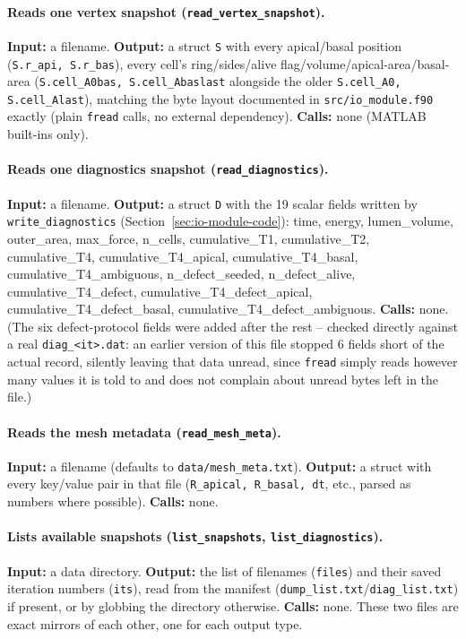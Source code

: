 \documentclass[11pt,a4paper]{report}
\begin{document}
\paragraph{Reads one vertex snapshot (\texttt{read\_vertex\_snapshot}).}
\textbf{Input:} a filename. \textbf{Output:} a struct \texttt{S} with
every apical/basal position (\texttt{S.r\_api, S.r\_bas}), every cell's
ring/sides/alive flag/volume/apical-area/basal-area
(\texttt{S.cell\_A0bas, S.cell\_Abaslast} alongside the older
\texttt{S.cell\_A0, S.cell\_Alast}), matching the byte layout documented
in \texttt{src/io\_module.f90} exactly (plain \texttt{fread} calls, no
external dependency). \textbf{Calls:} none (MATLAB built-ins only).
\paragraph{Reads one diagnostics snapshot (\texttt{read\_diagnostics}).}
\textbf{Input:} a filename. \textbf{Output:} a struct \texttt{D} with
the 19 scalar fields written by \texttt{write\_diagnostics}
(Section~\ref{sec:io-module-code}): time, energy, lumen\_volume,
outer\_area, max\_force, n\_cells, cumulative\_T1, cumulative\_T2,
cumulative\_T4, cumulative\_T4\_apical, cumulative\_T4\_basal,
cumulative\_T4\_ambiguous, n\_defect\_seeded, n\_defect\_alive,
cumulative\_T4\_defect, cumulative\_T4\_defect\_apical,
cumulative\_T4\_defect\_basal, cumulative\_T4\_defect\_ambiguous.
\textbf{Calls:} none. (The six defect-protocol fields were added after
the rest -- checked directly against a real \texttt{diag\_<it>.dat}: an
earlier version of this file stopped 6 fields short of the actual
record, silently leaving that data unread, since \texttt{fread} simply
reads however many values it is told to and does not complain about
unread bytes left in the file.)
\paragraph{Reads the mesh metadata (\texttt{read\_mesh\_meta}).}
\textbf{Input:} a filename (defaults to \texttt{data/mesh\_meta.txt}).
\textbf{Output:} a struct with every key/value pair in that file
(\texttt{R\_apical, R\_basal, dt}, etc., parsed as numbers where
possible). \textbf{Calls:} none.
\paragraph{Lists available snapshots (\texttt{list\_snapshots},
\texttt{list\_diagnostics}).} \textbf{Input:} a data directory.
\textbf{Output:} the list of filenames (\texttt{files}) and their saved
iteration numbers (\texttt{its}), read from the manifest
(\texttt{dump\_list.txt}/\texttt{diag\_list.txt}) if present, or by
globbing the directory otherwise. \textbf{Calls:} none. These two files
are exact mirrors of each other, one for each output type.
\end{document}
